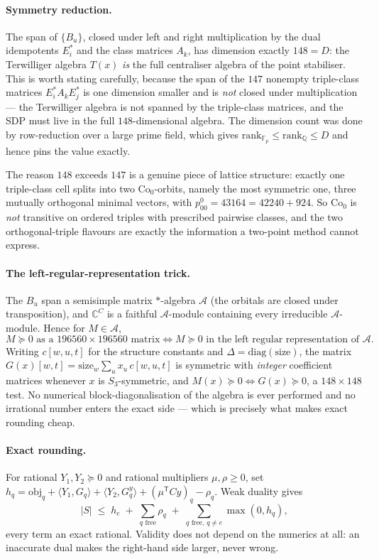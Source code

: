 \documentclass[10pt,a4paper]{article}
\newcommand{\Co}{\mathrm{Co}_0}
\begin{document}
\paragraph{Symmetry reduction.} The span of $\{B_u\}$, closed under left and right multiplication
by the dual idempotents $E_i^{*}$ and the class matrices $A_k$, has dimension exactly $148 = D$:
the Terwilliger algebra $T(x)$ \emph{is} the full centraliser algebra of the point stabiliser.
This is worth stating carefully, because the span of the $147$ nonempty triple-class matrices
$E_i^{*}A_kE_j^{*}$ is one dimension smaller and is \emph{not} closed under multiplication --- the
Terwilliger algebra is not spanned by the triple-class matrices, and the SDP must live in the full
$148$-dimensional algebra. The dimension count was done by row-reduction over a large prime field,
which gives $\mathrm{rank}_{\mathbb{F}_p} \le \mathrm{rank}_{\mathbb{Q}} \le D$ and hence pins the
value exactly.

The reason $148$ exceeds $147$ is a genuine piece of lattice structure: exactly one triple-class
cell splits into two $\Co$-orbits, namely the most symmetric one, three mutually orthogonal minimal
vectors, with $p^0_{00} = 43164 = 42240 + 924$. So $\Co$ is \emph{not} transitive on ordered
triples with prescribed pairwise classes, and the two orthogonal-triple flavours are exactly the
information a two-point method cannot express.

\paragraph{The left-regular-representation trick.} The $B_u$ span a semisimple matrix
$*$-algebra $\mathcal{A}$ (the orbitals are closed under transposition), and $\mathbb{C}^{C}$ is a
faithful $\mathcal{A}$-module containing every irreducible $\mathcal{A}$-module. Hence for
$M \in \mathcal{A}$,
\[
  M \succeq 0 \text{ as a } 196560 \times 196560 \text{ matrix}
  \iff M \succeq 0 \text{ in the left regular representation of } \mathcal{A}.
\]
Writing $c[w,u,t]$ for the structure constants and $\Delta = \mathrm{diag}(\mathrm{size})$, the
matrix $G(x)[w,t] = \mathrm{size}_w \sum_u x_u\, c[w,u,t]$ is symmetric with \emph{integer}
coefficient matrices whenever $x$ is $S_3$-symmetric, and $M(x) \succeq 0 \iff G(x) \succeq 0$,
a $148 \times 148$ test. No numerical block-diagonalisation of the algebra is ever performed and no
irrational number enters the exact side --- which is precisely what makes exact rounding cheap.

\paragraph{Exact rounding.} For rational $Y_1, Y_2 \succeq 0$ and rational multipliers
$\mu, \rho \ge 0$, set $h_q = \mathrm{obj}_q + \langle Y_1, G_q\rangle + \langle Y_2, G^y_q\rangle
+ (\mu^{\mathsf T}Cy)_q - \rho_q$. Weak duality gives
\[
  |S| \;\le\; h_e \;+\; \sum_{q \text{ free}} \rho_q \;+\; \sum_{q \text{ free},\, q \ne e} \max(0, h_q),
\]
every term an exact rational. Validity does not depend on the numerics at all: an inaccurate dual
makes the right-hand side larger, never wrong.
\end{document}
